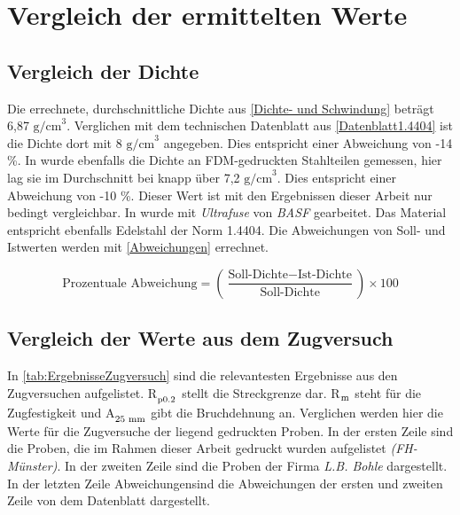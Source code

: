 \section{Vergleich der ermittelten Werte}
\label{sec:Vergleich}

\subsection{Vergleich der Dichte}

Die errechnete, durchschnittliche Dichte aus \autoref{Dichte- und Schwindung} beträgt 6,87 \(\text{g/cm}^3\). Verglichen mit dem technischen Datenblatt aus \autoref{Datenblatt1.4404} ist die Dichte dort mit 8 \(\text{g/cm}^3\) angegeben. Dies entspricht einer Abweichung von -14 \%. In \Autocite{Quarto.2021} wurde ebenfalls die Dichte an FDM-gedruckten Stahlteilen gemessen, hier lag sie im Durchschnitt bei knapp über 7,2 \(\text{g/cm}^3\). Dies entspricht einer Abweichung von -10 \%. Dieser Wert ist mit den Ergebnissen dieser Arbeit nur bedingt vergleichbar. In \autocite{Quarto.2021} wurde mit \textit{Ultrafuse} von \textit{BASF} gearbeitet. Das Material entspricht ebenfalls Edelstahl der Norm 1.4404. Die Abweichungen von Soll- und Istwerten werden mit \autoref{Abweichungen} errechnet.

\begin{equation}
  \text{Prozentuale Abweichung} = \left( \frac{\text{Soll-Dichte} - \text{Ist-Dichte}}{\text{Soll-Dichte}} \right) \times 100
  \label{Abweichungen}
\end{equation}
  


\subsection{Vergleich der Werte aus dem Zugversuch}

In \autoref{tab:ErgebnisseZugversuch} sind die relevantesten Ergebnisse aus den Zugversuchen aufgelistet. R$_{\textsubscript{p0.2}}$ stellt die Streckgrenze dar. R$_{\textsubscript{m}}$ steht für die Zugfestigkeit und A$_{\textsubscript{25 mm}}$ gibt die Bruchdehnung an. Verglichen werden hier die Werte für die Zugversuche der liegend gedruckten Proben. In der ersten Zeile sind die Proben, die im Rahmen dieser Arbeit gedruckt wurden aufgelistet \textit{(FH-Münster)}. In der zweiten Zeile sind die Proben der Firma \textit{L.B. Bohle} dargestellt. In der letzten Zeile \glqq Abweichungen\grqq sind die Abweichungen der ersten und zweiten Zeile von dem Datenblatt dargestellt.

